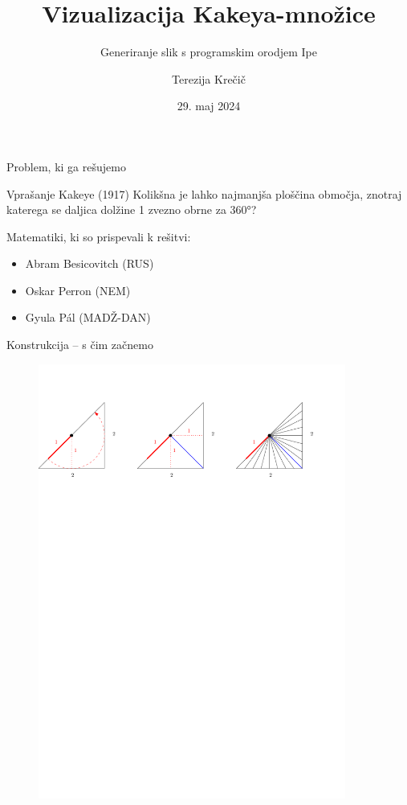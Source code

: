\documentclass{beamer}
\title{Vizualizacija Kakeya-množice}
\subtitle{Generiranje slik s programskim orodjem Ipe}
\author{Terezija Krečič}
\institute[FMF] %
{
    Fakulteta za matematiko in fiziko \\
    Pedagoška matematika 
    \vskip 3pt
}
\date{29. maj 2024} %
\begin{document}
\begin{frame}
    \titlepage
\end{frame}


\begin{frame}{Problem, ki ga rešujemo}
    \begin{alertblock}{Vprašanje Kakeye (1917)}
        Kolikšna je lahko najmanjša ploščina območja, znotraj katerega se daljica dolžine 1 zvezno obrne za 360°?
    \end{alertblock}
    \pause
    Matematiki, ki so prispevali k rešitvi:
    \begin{itemize}
        \item Abram Besicovitch (RUS)
        \item Oskar Perron (NEM)
        \item Gyula Pál (MADŽ-DAN)
    \end{itemize}
\end{frame}


\begin{frame}{Konstrukcija -- s čim začnemo}
    \begin{figure}
        \centering
        \includegraphics[width=0.9\textwidth]{ipe_slike/trikotnik_razdelitev.pdf}
    \end{figure}
\end{frame}
\end{document}
